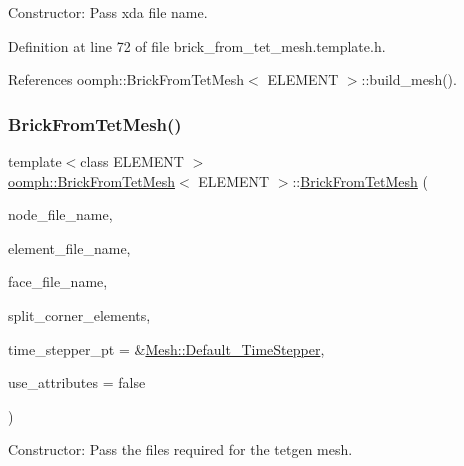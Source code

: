 Constructor\+: Pass xda file name. 



Definition at line 72 of file brick\+\_\+from\+\_\+tet\+\_\+mesh.\+template.\+h.



References oomph\+::\+Brick\+From\+Tet\+Mesh$<$ E\+L\+E\+M\+E\+N\+T $>$\+::build\+\_\+mesh().

\mbox{\label{classoomph_1_1BrickFromTetMesh_af05fe6ff520986d7794c467fc1885f92}} 
\subsubsection{\texorpdfstring{Brick\+From\+Tet\+Mesh()}{BrickFromTetMesh()}\hspace{0.1cm}{\footnotesize\ttfamily [2/3]}}
{\footnotesize\ttfamily template$<$class E\+L\+E\+M\+E\+NT $>$ \\
\hyperlink{classoomph_1_1BrickFromTetMesh}{oomph\+::\+Brick\+From\+Tet\+Mesh}$<$ E\+L\+E\+M\+E\+NT $>$\+::\hyperlink{classoomph_1_1BrickFromTetMesh}{Brick\+From\+Tet\+Mesh} (\begin{DoxyParamCaption}\item[{const std\+::string \&}]{node\+\_\+file\+\_\+name,  }\item[{const std\+::string \&}]{element\+\_\+file\+\_\+name,  }\item[{const std\+::string \&}]{face\+\_\+file\+\_\+name,  }\item[{const bool \&}]{split\+\_\+corner\+\_\+elements,  }\item[{\hyperlink{classoomph_1_1TimeStepper}{Time\+Stepper} $\ast$}]{time\+\_\+stepper\+\_\+pt = {\ttfamily \&\hyperlink{classoomph_1_1Mesh_a12243d0fee2b1fcee729ee5a4777ea10}{Mesh\+::\+Default\+\_\+\+Time\+Stepper}},  }\item[{const bool \&}]{use\+\_\+attributes = {\ttfamily false} }\end{DoxyParamCaption})\hspace{0.3cm}{\ttfamily [inline]}}



Constructor\+: Pass the files required for the tetgen mesh. 



